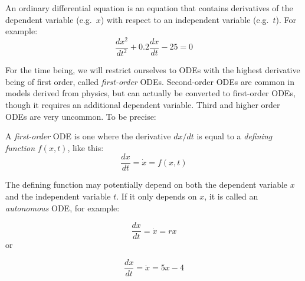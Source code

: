 \documentclass[
  letterpaper,
  DIV=11,
  numbers=noendperiod]{scrreprt}
\begin{document}
\begin{tcolorbox}[enhanced jigsaw, coltitle=black, arc=.35mm, opacitybacktitle=0.6, breakable, bottomtitle=1mm, toptitle=1mm, titlerule=0mm, colback=white, leftrule=.75mm, rightrule=.15mm, colframe=quarto-callout-note-color-frame, colbacktitle=quarto-callout-note-color!10!white, opacityback=0, title=\textcolor{quarto-callout-note-color}{\faInfo}\hspace{0.5em}{Definition}, left=2mm, toprule=.15mm, bottomrule=.15mm]

An ordinary differential equation is an equation that contains
derivatives of the  dependent variable
(e.g.~\(x\)) with respect to an independent variable (e.g.~\(t\)). For
example: \[ \frac{dx^2}{dt^2}+ 0.2 \frac{dx}{dt} - 25 = 0 \]

\end{tcolorbox}

For the time being, we will restrict ourselves to ODEs with the highest
derivative being of first order, called \emph{first-order} ODEs.
Second-order ODEs are common in models derived from physics, but can
actually be converted to first-order ODEs, though it requires an
additional dependent variable. Third and higher order ODEs are very
uncommon. To be precise:

\begin{tcolorbox}[enhanced jigsaw, coltitle=black, arc=.35mm, opacitybacktitle=0.6, breakable, bottomtitle=1mm, toptitle=1mm, titlerule=0mm, colback=white, leftrule=.75mm, rightrule=.15mm, colframe=quarto-callout-note-color-frame, colbacktitle=quarto-callout-note-color!10!white, opacityback=0, title=\textcolor{quarto-callout-note-color}{\faInfo}\hspace{0.5em}{Definition}, left=2mm, toprule=.15mm, bottomrule=.15mm]

A \emph{first-order} ODE is one where the derivative \(dx/dt\) is equal
to a \emph{defining function} \(f(x,t)\), like this:
\[\frac{dx} {dt} = \dot x = f(x,t)\]

\end{tcolorbox}

The defining function may potentially depend on both the dependent
variable \(x\) and the  independent variable
\(t\). If it only depends on \(x\), it is called an \emph{autonomous}
ODE, for example:

\[ \frac{dx}{dt} = \dot x = rx \] or

\[\frac{dx}{dt} = \dot x = 5x -4\]
\end{document}
